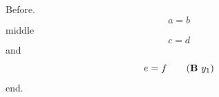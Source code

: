 \documentclass[10pt]{article}
\begin{document}
Before.
\begin{equation} a = b \tag{hi $x^2$} \end{equation}
middle
\begin{equation} c = d \tag{$\ast$} \end{equation}
and
\begin{equation} e = f \tag{\textbf{B} $y_1$} \end{equation}
end.
\end{document}
